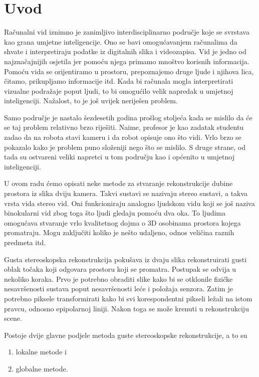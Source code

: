 \documentclass[utf8, zavrsni, numeric]{fer}
\begin{document}
\tableofcontents

\chapter{Uvod}
Računalni vid iznimno je zanimljivo interdisciplinarno područje koje se svrstava kao grana umjetne inteligencije.
Ono se bavi omogućavanjem računalima da shvate i interpretiraju podatke iz digitalnih slika i videozapisa.
Vid je jedno od najznačajnijih osjetila jer pomoću njega primamo mnoštvo korisnih informacija.
Pomoću vida se orijentiramo u prostoru, prepoznajemo druge ljude i njihova lica, čitamo, prikupljamo informacije itd.
Kada bi računala mogla interpretirati vizualne podražaje poput ljudi, to bi omogućilo velik
napredak u umjetnoj inteligenciji. Nažalost, to je još uvijek neriješen problem.

Samo područje
je nastalo šezdesetih godina prošlog stoljeća kada se mislilo da će se taj problem relativno brzo riješiti.
Naime, profesor je kao zadatak studentu zadao da na robota stavi kameru i da robot opisuje ono što vidi.
Vrlo brzo se pokazalo kako je problem puno složeniji nego što se mislilo.
S druge strane, od tada su ostvareni veliki napretci u tom području kao i općenito u umjetnoj inteligenciji.

U ovom radu ćemo opisati neke metode za stvaranje rekonstrukcije dubine prostora iz slika dviju kamera. Takvi sustavi se nazivaju stereo sustavi, a takva vrsta vida stereo vid.
Oni funkcioniraju analogno ljudskom vidu koji se još naziva binokularni vid zbog toga što ljudi gledaju pomoću dva oka. To ljudima omogućava stvaranje vrlo kvalitetnog dojma o 3D osobinama prostora kojega promatraju. Mogu zaključiti koliko je nešto udaljeno, odnos veličina raznih predmeta itd.

Gusta stereoskopska rekonstrukcija pokušava iz dvaju slika rekonstruirati gusti oblak točaka koji
odgovara prostoru koji se promatra. Postupak se odvija u nekoliko koraka.
Prvo je potrebno obraditi slike kako bi se otklonile fizičke nesavršenosti sustava poput nesavršenosti leće i položaja senzora. Zatim je potrebno piksele
transformirati kako bi svi korespondentni pikseli ležali na istom pravcu, odnosno epipolarnoj liniji. Nakon toga se može krenuti u rekonstrukciju scene.

Postoje dvije glavne podjele metoda guste stereoskopske rekonstrukcije, a to su
\begin{enumerate}
  \item lokalne metode i
  \item globalne metode.
\end{enumerate}
\end{document}
